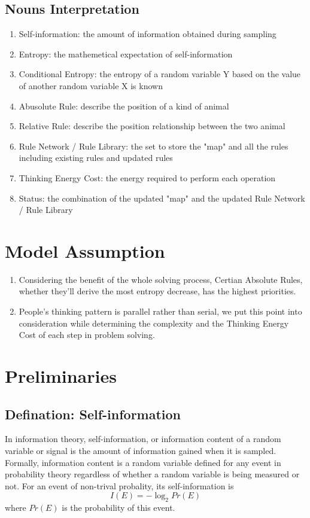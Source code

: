 \documentclass[12pt,a4paper,]{article}
\begin{document}
\subsection{Nouns Interpretation}
\begin{enumerate}[(1)]
\item Self-information: the amount of information obtained during sampling
\item Entropy: the mathemetical expectation of self-information
\item Conditional Entropy: the entropy of a random variable Y based on the value of another random variable X is known
\item Abusolute Rule: describe the position of a kind of animal 
\item Relative Rule: describe the position relationship between the two animal
\item Rule Network / Rule Library: the set to store the "map" and all the rules including existing rules and updated rules 
\item Thinking Energy Cost: the energy required to perform each operation
\item Status: the combination of the updated "map" and the updated Rule Network / Rule Library

\end{enumerate}
\section{Model Assumption}
\begin{enumerate}[(1)]
\item Considering the benefit of the whole solving process, Certian Absolute Rules, whether they'll derive the most entropy decrease, has the highest priorities.
\item People's thinking pattern is parallel rather than serial, we put this point into consideration while determining the complexity and the Thinking Energy Cost of each step in problem solving. 
\end{enumerate}


\section{Preliminaries}
\subsection{Defination: Self-information}
In information theory, self-information, or information content of a random variable or signal is the amount of information gained when it is sampled. Formally, information content is a random variable defined for any event in probability theory regardless of whether a random variable is being measured or not. For an event of non-trival probality, its self-information is
\begin{equation}
I(E) = -\log_{2}{Pr(E)}
\end{equation} 
where $Pr(E)$ is the probability of this event.
\end{document}
